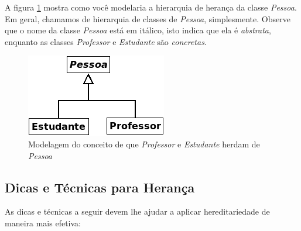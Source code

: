 A figura \ref{fig:uml2} mostra como você modelaria a hierarquia de herança da classe \emph{Pessoa}. Em geral, chamamos de hierarquia de classes de \emph{Pessoa}, simplesmente. Observe que o nome da classe \emph{Pessoa} está em itálico, isto indica que ela é \textit{abstrata}, enquanto as classes \emph{Professor} e \emph{Estudante} são \textit{concretas}.

\begin{figure}[h]
\begin{center}
\includegraphics[scale=0.8]{uml2.png} 
\caption{Modelagem do conceito de que \emph{Professor} e \emph{Estudante} herdam de \emph{Pessoa}} \label{fig:uml2}
\end{center}
\end{figure}

\subsection{Dicas e Técnicas para Herança}

As dicas e técnicas a seguir devem lhe ajudar a aplicar hereditariedade de maneira mais efetiva:

